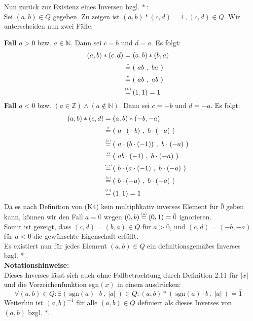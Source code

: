 \documentclass[a4paper,graphics,12pt]{article}
\newcommand{\up}[2]{\mathrel{\overset{\makebox[0pt]{\mbox{\normalfont\tiny #2}}}{#1}}}
\newcommand{\pair}[2]{(\ #1\ ,\ #2\ )}
\begin{document}
Nun zurück zur Existenz eines Inversen bzgl. $*$\,:\\
Sei $(a,b) \in Q$ gegeben. Zu zeigen ist $(a,b) * (c,d) = \bar{1}\ , (c,d) \in Q$.
Wir unterscheiden nun zwei Fälle:

\textbf{Fall} $a>0$ bzw. $a \in \mathbb{N}$.
Dann sei $c = b$ und $d = a$. Es folgt:
\begin{align*}
    (a,b) * (c,d) &= (a,b) * (b,a) \\[1pt]
    &\up{=}{$*$} \pair{ab}{ba} \\[1pt]
    &\up{=}{v} \pair{ab}{ab} \\[1pt]
    &\up{=}{(b)} (1,1) = \bar{1}
\end{align*}
\textbf{Fall} $a<0$ bzw. $(a \in \mathbb{Z}) \land (a \notin \mathbb{N})$.
Dann sei $c = -b$ und $d = -a$. Es folgt:
\begin{align*}
    (a,b) * (c,d) &= (a,b) * (-b,-a) \\[1pt]
    &\up{=}{$*$} \pair{a\cdot (-b)}{b\cdot (-a)} \\[1pt]
    &\up{=}{(c)} \pair{a\cdot (b\cdot (-1))}{b\cdot (-a)} \\[1pt]
    &\up{=}{vi} \pair{ab\cdot (-1)}{b \cdot (-a)} \\[1pt]
    &\up{=}{v,vi} \pair{b\cdot (a\cdot (-1)}{b \cdot (-a)} \\[1pt]
    &\up{=}{(c)} \pair{b\cdot (-a)}{b\cdot (-a)} \\[1pt]
    &\up{=}{(b)} (1,1) = \bar{1}
\end{align*}
Da es nach Definition von (K4) kein multiplikativ inverses Element für $\bar{0}$ geben kann,
können wir den Fall $a = 0$ wegen $(0,b) \up{=}{(a)} (0,1) = \bar{0}$ ignorieren.\\
Somit ist gezeigt, dass $(c,d) = (b,a) \in Q$ für $a>0$,
und $(c,d) = (-b,-a)$ für $a<0$ die gewünschte Eigenschaft erfüllt.\\
Es existiert nun für jedes Element $(a,b)\in Q$ ein definitionsgemäßes Inverses bzgl. *\,.\\
\textbf{Notationshinweise:}\\
Dieses Inverses lässt sich auch ohne Fallbetrachtung durch Definition 2.11 für $\vert x \vert$ und die Vorzeichenfunktion sgn$(x)$ in einem ausdrücken:
$$ 
\forall (a,b) \in Q\colon \exists \pair{\text{sgn}(a)\cdot b}{\vert a\vert} \in Q \colon
(a,b) * \pair{\text{sgn}(a)\cdot b}{\vert a\vert} = \bar{1}
$$
Weiterhin ist $(a,b)^{-1}$ für alle $(a,b) \in Q$ definiert als dieses Inverses von $(a,b)$ bzgl. $*$.
\newpage
\end{document}
